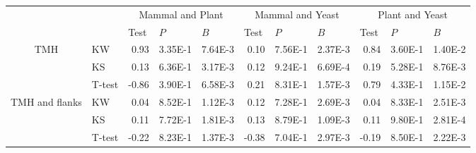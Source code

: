 \begin{table}[htbp]
    \begin{tabular}{clrrrrrrrrr}
          &       & \multicolumn{3}{c}{Mammal and Plant} & \multicolumn{3}{c}{Mammal and Yeast} & \multicolumn{3}{c}{Plant and Yeast} \\
          &       & \multicolumn{1}{l}{Test} & \multicolumn{1}{l}{$P$} & \multicolumn{1}{l}{$B$} & \multicolumn{1}{l}{Test} & \multicolumn{1}{l}{$P$} & \multicolumn{1}{l}{$B$} & \multicolumn{1}{l}{Test} & \multicolumn{1}{l}{$P$} & \multicolumn{1}{l}{$B$} \\
    \multirow{3}[0]{*}{TMH } &  KW & 0.93  & 3.35E-1 & 7.64E-3 & 0.10  & 7.56E-1 & 2.37E-3 & 0.84  & 3.60E-1 & 1.40E-2 \\
          &  KS & 0.13  & 6.36E-1 & 3.17E-3 & 0.12  & 9.24E-1 & 6.69E-4 & 0.19  & 5.28E-1 & 8.76E-3 \\
          &  T-test & -0.86 & 3.90E-1 & 6.58E-3 & 0.21  & 8.31E-1 & 1.57E-3 & 0.79  & 4.33E-1 & 1.15E-2 \\
    \multirow{3}[0]{*}{TMH and flanks } &  KW & 0.04  & 8.52E-1 & 1.12E-3 & 0.12  & 7.28E-1 & 2.69E-3 & 0.04  & 8.33E-1 & 2.51E-3 \\
          &  KS & 0.11  & 7.72E-1 & 1.81E-3 & 0.13  & 8.79E-1 & 1.09E-3 & 0.11  & 9.80E-1 & 2.81E-4 \\
          &  T-test & -0.22 & 8.23E-1 & 1.37E-3 & -0.38 & 7.04E-1 & 2.97E-3 & -0.19 & 8.50E-1 & 2.22E-3 \\
    \end{tabular}%
                \label{table:speciestableswissprotstats}

\end{table}%

